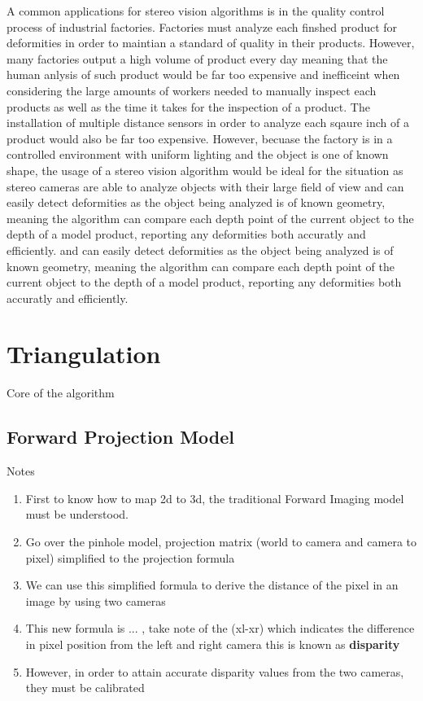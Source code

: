 \documentclass[11pt]{scrartcl}
\begin{document}
A common applications for stereo vision algorithms is in the quality
control process of industrial factories. Factories must analyze each
finshed product for deformities in order to maintian a standard of quality in their 
products. However, many factories output a high volume of product every day meaning that
the human anlysis of such product would be far too expensive and inefficeint when
considering the large amounts of workers needed to manually inspect each products
as well as the time it takes for the inspection of a product. The installation of multiple
distance sensors in order to analyze each sqaure inch of a product would also be far too expensive. 
However, becuase the factory is in a controlled environment with uniform lighting and the object is one
of known shape, the usage of a stereo vision algorithm would be ideal for the situation as stereo cameras 
are able to analyze objects with their large field of view and can easily detect deformities as the object 
being analyzed is of known geometry, meaning the algorithm can compare each depth point of the current object 
to the depth of a model product, reporting any deformities both accuratly and efficiently.  and can easily detect deformities as the object 
being analyzed is of known geometry, meaning the algorithm can compare each depth point of the current object 
to the depth of a model product, reporting any deformities both accuratly and efficiently. 

\section{Triangulation}
Core of the algorithm

\subsection{Forward Projection Model}
\begin{remark}
    Notes{\begin{enumerate}
        \item First to know how to map 2d to 3d, the traditional Forward Imaging model must be understood. 
        \item Go over the pinhole model, projection matrix (world to camera and camera to pixel) simplified to the projection formula
        \item We can use this simplified formula to derive the distance of the pixel in an image by using two cameras
        \item This new formula is ... , take note of the (xl-xr) which indicates the difference in pixel position from the left and right camera
            this is known as \textbf{disparity}
        \item However, in order to attain accurate disparity values from the two cameras, they must be calibrated 
    \end{enumerate}} %
    \label{par:Notes}
    
\end{remark}
\end{document}
